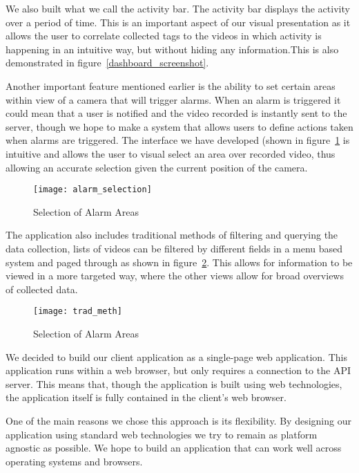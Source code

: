 We also built what we call the activity bar. The activity bar displays the
activity over a period of time. This is an important aspect of our visual
presentation as it allows the user to correlate collected tags to the videos in
which activity is happening in an intuitive way, but without hiding any
information.This is also demonstrated in figure~\ref{dashboard_screenshot}.

Another important feature mentioned earlier is the ability to set certain areas
within view of a camera that will trigger alarms. When an alarm is triggered it
could mean that a user is notified and the video recorded is instantly sent to
the server, though we hope to make a system that allows users to define actions
taken when alarms are triggered. The interface we have developed (shown in
figure~\ref{alarm_selection} is intuitive and allows the user to visual select
an area over recorded video, thus allowing an accurate selection given the
current position of the camera.

\begin{figure}[!t]
\centering
\texttt{[image: alarm\_selection]}
\caption{Selection of Alarm Areas}
\label{alarm_selection}
\end{figure}

The application also includes traditional methods of filtering and querying the
data collection, lists of videos can be filtered by different fields in a menu
based system and paged through as shown in figure~\ref{trad_meth}. This allows
for information to be viewed in a more targeted way, where the other views allow
for broad overviews of collected data.

\begin{figure}[!t]
\centering
\texttt{[image: trad\_meth]}
\caption{Selection of Alarm Areas}
\label{trad_meth}
\end{figure}

We decided to build our client application as a single-page web application.
This application runs within a web browser, but only requires a connection to
the API server. This means that, though the application is built using web
technologies, the application itself is fully contained in the client's web
browser.

One of the main reasons we chose this approach is its flexibility. By designing
our application using standard web technologies we try to remain as platform
agnostic as possible. We hope to build an application that can work well across
operating systems and browsers.

